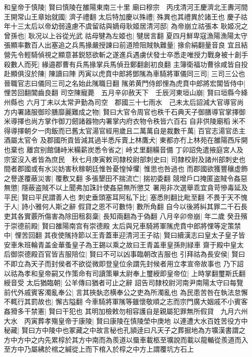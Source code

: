 和皇帝于慎陵|{
	賢曰慎陵在雒陽東南三十里}
廟曰穆宗　丙戌清河王慶濟北王夀河間王開常山王章始就國|{
	濟子禮翻}
太后特加慶以殊禮|{
	殊異也其禮異於諸王也}
慶子祜年十三太后以帝幼弱遠慮不虞留祜與嫡母耿姬居清河邸|{
	為帝崩立祜張本}
耿姬况之曾孫也|{
	耿况以上谷從光武}
祜母犍為左姬也|{
	犍居言翻}
夏四月鮮卑寇漁陽漁陽太守張顯率數百人出塞追之兵馬掾嚴授諫曰前道險阻賊執難量|{
	掾俞絹翻量音良}
宜且結營先令輕騎偵視之顯意甚鋭怒欲斬之遂進兵遇虜伏發士卒悉走唯授力戰身被十創手殺數人而死|{
	緣邉郡曹有兵馬掾掌兵馬偵丑鄭翻創初良翻}
主簿衛福功曹徐咸皆自投赴顯俱沒於陳|{
	陳讀曰陣}
丙寅以虎賁中郎將鄧隲為車騎將軍儀同三司|{
	三司三公也晉職官志曰儀同三司之名始此隲職日翻}
隲弟黄門侍郎悝為虎賁中郎將宏閶皆侍中|{
	悝苦回翻閶齒良翻}
司空陳寵薨　五月辛卯赦天下　壬辰河東垣山崩|{
	賢曰垣縣今絳州縣也}
六月丁未以太常尹勤為司空　郡國三十七雨水　己未太后詔減大官導官尚方内署諸服御珍膳靡麗難成之物|{
	賢曰大官令周官也秩千石典天子御膳導官掌擇御米導擇也尚方掌作御刀劒諸器物内署掌内府衣物令秩皆六百石}
自非供陵廟稻米不得導擇朝夕一肉飯而已舊太官湯官經用歲且二萬萬自是裁數千萬|{
	百官志湯官丞主酒屬太官令}
及郡國所貢皆減其過半悉斥賣上林鷹犬|{
	東都亦冇上林苑在雒陽西斥開也棄也}
離宫别館儲峙米糒薪炭悉令省之|{
	峙丈里翻糒音備}
丁卯詔免遣掖庭宮人及宗室沒入者皆為庶民　秋七月庚寅敕司隸校尉部刺史曰|{
	司隸校尉及諸州部刺史也}
間者郡國或有水災妨害秋稼朝廷惟咎憂惶悼懼|{
	惟思也咎過也}
而郡國欲獲豐穰虚飾之譽遂覆蔽災害|{
	覆敷又翻}
多張墾田不揣流亡|{
	揣初委翻}
競增戶口掩匿盗賊令姦惡無懲|{
	隱蔽盗賊不以上聞弗加誅計使姦惡無所懲艾}
署用非次選舉乖宜貪苛慘毒延及平民|{
	賢曰平民謂善人也}
刺史垂頭塞耳阿私下比|{
	塞悉則翻比毗至翻}
不畏于天不愧于人|{
	詩小雅何人斯之辭}
假貸之恩不可數恃|{
	數所角翻}
自今以後將糾其罪二千石長吏其各實覈所傷害為除田租芻稾|{
	長知兩翻為于偽翻}
八月辛卯帝崩|{
	年二歲}
癸丑殯于崇德前殿|{
	賢曰雒陽南宫有崇德殿}
太后與兄車騎將軍隲虎賁中郎將悝等定策禁中|{
	悝苦回翻}
其夜使隲持節以王青蓋車迎清河王子祜|{
	賢曰續漢志曰皇太子皇子皆安車朱班輪青盖金華蚤皇子為王錫以乘之故曰王青盖車皇孫則緑車}
齋于殿中皇太后御崇德殿百官皆吉服陪位|{
	賢曰不可以凶事臨朝改吉服也}
引拜祜為長安侯|{
	賢曰不即立為天子而封侯者不欲從微即登皇位余謂先封候者用立孝宣帝故事也}
乃下詔以祜為孝和皇帝嗣又作策命有司讀策畢太尉奉上璽綬即皇帝位|{
	上時掌翻璽斯氏翻綬音受}
太后猶臨朝|{
	公羊傳曰猶者可止之辭}
詔告司隸校尉河南尹南陽太守曰每覽前代外戚賓客濁亂奉公|{
	言其挾埶恣横奉公之吏為所濁亂也}
為民患苦咎在執法怠懈不輒行其罰故也|{
	懈古隘翻}
今車騎將軍隲等雖懷敬順之志而宗門廣大姻戚不小賓客姦猾多干禁憲|{
	賢曰干犯也}
其明加檢敕勿相容護自是親屬犯罪無所假貸　九月六州大水　丙寅葬孝殤皇帝于康陵|{
	賢曰康陵在慎陵塋中庚地}
以連遭大水百姓苦役方中秘藏|{
	賢曰方中陵中也冢藏之中故言秘也孔頴逹曰凡天子之葬掘地為方壙漢書謂之方中方中之内先累椁於其方中南而為羨道以蜃車載柩至壙說而載以龍輴從羨道而入至方中乃屬紼於棺之緘從上而下棺入於椁之中方上謂覆坑方石上}
